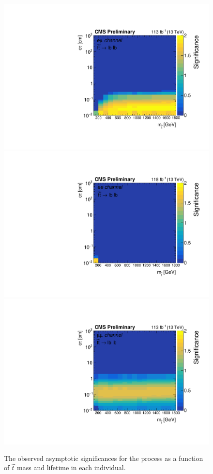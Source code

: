 \begin{figure}[hbtp]
\centering
\includegraphics[scale=0.3]{figures/results/emu_lb_significance.pdf}
\includegraphics[scale=0.3]{figures/results/ee_lb_significance.pdf}
\includegraphics[scale=0.3]{figures/results/mumu_lb_significance.pdf}
\caption{The observed asymptotic significances for the \stoptolb process as a function of $\widetilde{t}$ mass and lifetime in each individual.}
\label{significance_channels_lb}
\end{figure}